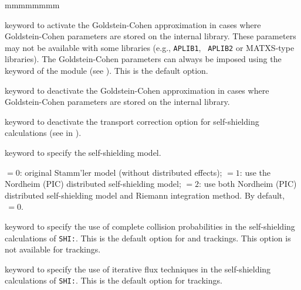 \begin{ListeDeDescription}{mmmmmmmm}
\item[\moc{GC}] keyword to activate the Goldstein-Cohen approximation in
cases where Goldstein-Cohen parameters are stored on the internal library. These
parameters may not be available with some libraries (e.g., {\tt APLIB1}, {\tt
APLIB2} or MATXS-type libraries). The Goldstein-Cohen parameters can always be
imposed using the  keyword of the  module (see
). This is the default option.

\item[\moc{NOGC}] keyword to deactivate the Goldstein-Cohen approximation in
cases where Goldstein-Cohen parameters are stored on the internal library.

\item[\moc{NOTR}] keyword to deactivate the transport correction option for
self-shielding calculations (see  in ).

\item[\moc{LEVEL}] keyword to specify the self-shielding model.

\item[\dusa{ilev}] $=0$: original Stamm'ler model (without distributed effects);
 $=1$: use the Nordheim (PIC) distributed self-shielding model\cite{toronto04};
 $=2$: use both Nordheim (PIC) distributed self-shielding model and Riemann integration
 method\cite{hasan}. By default, $\,=0$.

\item[\moc{PIJ}] keyword to specify the use of complete collision
probabilities in the self-shielding calculations of {\tt SHI:}.
This is the default option for  and  trackings.
This option is not available for  trackings.

\item[\moc{ARM}] keyword to specify the use of iterative flux techniques
in the self-shielding calculations of {\tt SHI:}.
This is the default option for  trackings.

\end{ListeDeDescription}
\eject
